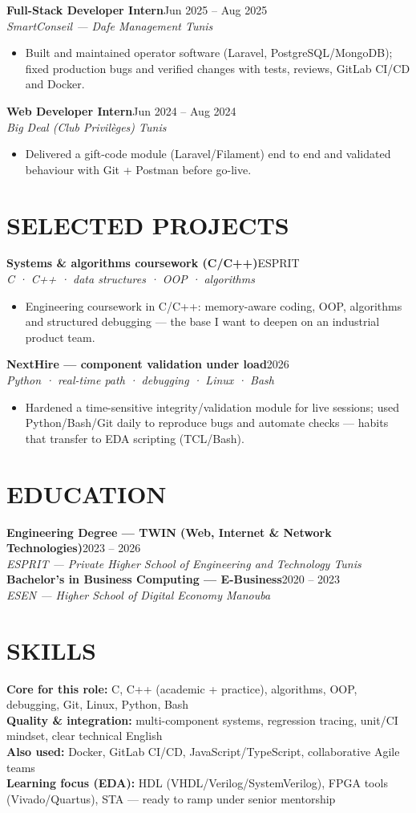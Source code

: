 \documentclass[10pt,a4paper]{article}
\newcommand{\job}[3]{%
  \textbf{\color{primary}#1}\hfill{\color{muted}\small #2}\\[-1pt]
  {\color{accent}\textit{#3}}\\[1pt]
  \begin{itemize}
}
\newcommand{\proj}[3]{%
  \textbf{\color{primary}#1}\hfill{\color{muted}\small #2}\\[-1pt]
  {\color{accent}\textit{#3}}\\[0.5pt]
  \begin{itemize}
}
\newcommand{\edu}[3]{%
  \textbf{\color{primary}#1}\hfill{\color{muted}\small #2}\\[-1pt]
  {\color{accent}\textit{#3}}\\[2pt]
}
\begin{document}
\job{Full-Stack Developer Intern}{Jun 2025 -- Aug 2025}{SmartConseil — Dafe Management \textbar{} Tunis}
  \item Built and maintained operator software (Laravel, PostgreSQL/MongoDB); fixed production bugs and verified changes with tests, reviews, GitLab CI/CD and Docker.
\end{itemize}

\job{Web Developer Intern}{Jun 2024 -- Aug 2024}{Big Deal (Club Privilèges) \textbar{} Tunis}
  \item Delivered a gift-code module (Laravel/Filament) end to end and validated behaviour with Git + Postman before go-live.
\end{itemize}

\section{SELECTED PROJECTS}
{\footnotesize
\proj{Systems \& algorithms coursework (C/C++)}{ESPRIT}{C · C++ · data structures · OOP · algorithms}
  \item Engineering coursework in C/C++: memory-aware coding, OOP, algorithms and structured debugging — the base I want to deepen on an industrial product team.
\end{itemize}
\proj{NextHire — component validation under load}{2026}{Python · real-time path · debugging · Linux · Bash}
  \item Hardened a time-sensitive integrity/validation module for live sessions; used Python/Bash/Git daily to reproduce bugs and automate checks — habits that transfer to EDA scripting (TCL/Bash).
\end{itemize}
}

\section{EDUCATION}
\edu{Engineering Degree — TWIN (Web, Internet \& Network Technologies)}{2023 -- 2026}{ESPRIT — Private Higher School of Engineering and Technology \textbar{} Tunis}
\edu{Bachelor's in Business Computing — E-Business}{2020 -- 2023}{ESEN — Higher School of Digital Economy \textbar{} Manouba}

\section{SKILLS}
{\small
\textbf{\color{primary}Core for this role:} C, C++ (academic + practice), algorithms, OOP, debugging, Git, Linux, Python, Bash\\[1pt]
\textbf{\color{primary}Quality \& integration:} multi-component systems, regression tracing, unit/CI mindset, clear technical English\\[1pt]
\textbf{\color{primary}Also used:} Docker, GitLab CI/CD, JavaScript/TypeScript, collaborative Agile teams\\[1pt]
\textbf{\color{primary}Learning focus (EDA):} HDL (VHDL/Verilog/SystemVerilog), FPGA tools (Vivado/Quartus), STA — ready to ramp under senior mentorship
}
\end{document}
